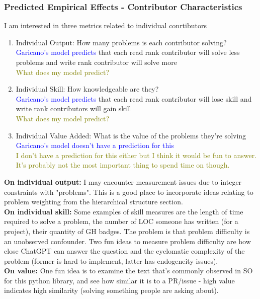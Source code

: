 \documentclass[source/paper/main.tex]{subfiles}
\begin{document}
\subsubsection{Predicted Empirical Effects - Contributor Characteristics}
I am interested in three metrics related to individual conrtibutors
\begin{enumerate}
    \item Individual Output: How many problems is each contributor solving?\\
    \textcolor{blue}{Garicano's model predicts } that each read rank contributor will solve less problems and write rank contributor will solve more\\
    \textcolor{olive}{What does my model predict?}
    \item Individual Skill: How knowledgeable are they? \\
    \textcolor{blue}{Garicano's model predicts } that each read rank contributor will lose skill and write rank contributors will gain skill\\
    \textcolor{olive}{What does my model predict?}
    \item Individual Value Added: What is the value of the problems they're solving
    \textcolor{blue}{Garicano's model doesn't have a prediction for this}\\
    \textcolor{olive}{I don't have a prediction for this either but I think it would be fun to answer. It's probably not the most important thing to spend time on though.}
\end{enumerate}
\textbf{On individual output:} I may encounter measurement issues due to integer constraints with "problems". This is a good place to incorporate ideas relating to problem weighting from the hierarchical structure section. \\
\textbf{On individual skill:} Some examples of skill measures are the length of time required to solve a problem, the number of LOC someone has written (for a project), their quantity of GH badges. The problem is that problem difficulty is an unobserved confounder. Two fun ideas to measure problem difficulty are how close ChatGPT can answer the question and the cyclomatic complexity of the problem (former is hard to implement, latter has endogeneity issues). \\
\textbf{On value: } One fun idea is to examine the text that's commonly observed in SO for this python library, and see how similar it is to a PR/issue - high value indicates high similarity (solving something people are asking about). 
\end{document}
